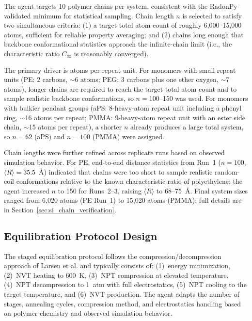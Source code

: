 \documentclass[journal=acsami,manuscript=suppinfo]{achemso}
\begin{document}
The agent targets 10 polymer chains per system, consistent with the RadonPy-validated minimum for statistical sampling.\cite{hayashi2022radonpy}
Chain length $n$ is selected to satisfy two simultaneous criteria: (1) a target total atom count of roughly 6{,}000--15{,}000 atoms, sufficient for reliable property averaging;\cite{hayashi2022radonpy} and (2) chains long enough that backbone conformational statistics approach the infinite-chain limit (i.e., the characteristic ratio $C_\infty$ is reasonably converged).

The primary driver is atoms per repeat unit.
For monomers with small repeat units (PE: 2 carbons, $\sim$6 atoms; PEG: 3 carbons plus one ether oxygen, $\sim$7 atoms), longer chains are required to reach the target total atom count and to sample realistic backbone conformations, so $n = 100$--150 was used.
For monomers with bulkier pendant groups (aPS: 8-heavy-atom repeat unit including a phenyl ring, $\sim$16 atoms per repeat; PMMA: 9-heavy-atom repeat unit with an ester side chain, $\sim$15 atoms per repeat), a shorter $n$ already produces a large total system, so $n = 62$ (aPS) and $n = 100$ (PMMA) were assigned.

Chain lengths were further refined across replicate runs based on observed simulation behavior.
For PE, end-to-end distance statistics from Run~1 ($n = 100$, $\langle R \rangle = 35.5$~\AA{}) indicated that chains were too short to sample realistic random-coil conformations relative to the known characteristic ratio of polyethylene; the agent increased $n$ to 150 for Runs~2--3, raising $\langle R \rangle$ to 68--75~\AA{}.
Final system sizes ranged from 6{,}020 atoms (PE Run~1) to 15{,}020 atoms (PMMA); full details are in Section~\ref{sec:si_chain_verification}.

\subsection{Equilibration Protocol Design}

The staged equilibration protocol follows the compression/decompression approach of Larsen et al.\cite{larsen2011molecular} and typically consists of: (1)~energy minimization, (2)~NVT heating to 600~K, (3)~NPT compression at elevated temperature, (4)~NPT decompression to 1~atm with full electrostatics, (5)~NPT cooling to the target temperature, and (6)~NVT production.
The agent adapts the number of stages, annealing cycles, compression method, and electrostatics handling based on polymer chemistry and observed simulation behavior.
\end{document}
